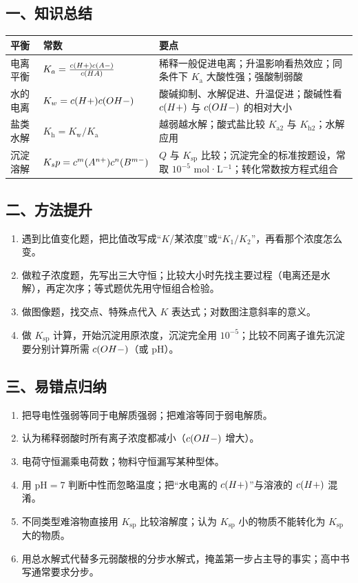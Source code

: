 \subsection*{一、知识总结}
\begin{center}
\small
\begin{tabularx}{\linewidth}{p{2.0cm}p{3.6cm}X}
\toprule
平衡 & 常数 & 要点 \\
\midrule
电离平衡 & $K_a=\frac{c(H+)c(A-)}{c(HA)}$ & 稀释一般促进电离；升温影响看热效应；同条件下 $K_\text{a}$ 大酸性强；强酸制弱酸 \\
水的电离 & $K_w=c(H+)c(OH-)$ & 酸碱抑制、水解促进、升温促进；酸碱性看 $c(H+)$ 与 $c(OH-)$ 的相对大小 \\
盐类水解 & $K_\text{h}=K_\text{w}/K_\text{a}$ & 越弱越水解；酸式盐比较 $K_{\text{a}2}$ 与 $K_{\text{h}2}$；水解应用 \\
沉淀溶解 & $K_sp=c^m(A^{n+})c^n(B^{m-})$ & $Q$ 与 $K_\text{sp}$ 比较；沉淀完全的标准按题设，常取 $10^{-5}$ mol·L$^{-1}$；转化常数按方程式组合 \\
\bottomrule
\end{tabularx}
\end{center}

\subsection*{二、方法提升}
\begin{enumerate}
\item 遇到比值变化题，把比值改写成“$K$/某浓度”或“$K_1/K_2$”，再看那个浓度怎么变。
\item 做粒子浓度题，先写出三大守恒；比较大小时先找主要过程（电离还是水解），再定次序；等式题优先用守恒组合检验。
\item 做图像题，找交点、特殊点代入 $K$ 表达式；对数图注意斜率的意义。
\item 做 $K_\text{sp}$ 计算，开始沉淀用原浓度，沉淀完全用 $10^{-5}$；比较不同离子谁先沉淀要分别计算所需 $c(OH-)$（或 pH）。
\end{enumerate}

\subsection*{三、易错点归纳}
\begin{enumerate}
\item 把导电性强弱等同于电解质强弱；把难溶等同于弱电解质。
\item 认为稀释弱酸时所有离子浓度都减小（$c(OH-)$ 增大）。
\item 电荷守恒漏乘电荷数；物料守恒漏写某种型体。
\item 用 pH$=7$ 判断中性而忽略温度；把“水电离的 $c(H+)$”与溶液的 $c(H+)$ 混淆。
\item 不同类型难溶物直接用 $K_\text{sp}$ 比较溶解度；认为 $K_\text{sp}$ 小的物质不能转化为 $K_\text{sp}$ 大的物质。
\item 用总水解式代替多元弱酸根的分步水解式，掩盖第一步占主导的事实；高中书写通常要求分步。
\end{enumerate}

